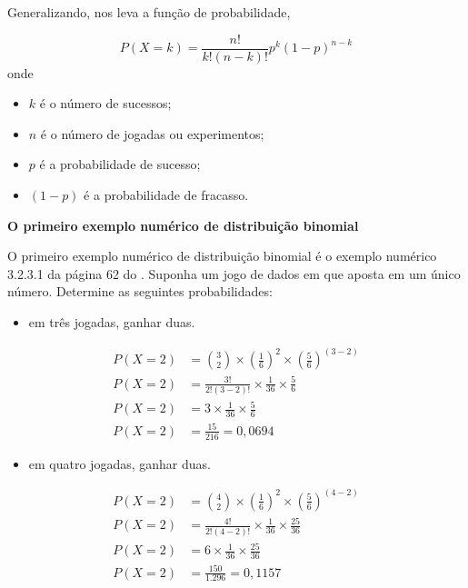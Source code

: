 \documentclass[
]{book}
\providecommand{\tightlist}{%
  \setlength{\itemsep}{0pt}\setlength{\parskip}{0pt}}
\begin{document}
Generalizando, nos leva a função de probabilidade,

\begin{equation*}
  P(X=k) = \frac{n!}{k!(n-k)!} p^k (1-p)^{n-k}
\end{equation*}
onde

\begin{itemize}
\tightlist
\item
  \(k\) é o número de sucessos;
\item
  \(n\) é o número de jogadas ou experimentos;
\item
  \(p\) é a probabilidade de sucesso;
\item
  \((1-p)\) é a probabilidade de fracasso.
\end{itemize}

\textbf{O primeiro exemplo numérico de distribuição binomial}

O primeiro exemplo numérico de distribuição binomial é o exemplo numérico 3.2.3.1 da página 62 do \citet{Sartoris2013}. Suponha um jogo de dados em que aposta em um único número. Determine as seguintes probabilidades:

\begin{itemize}
\tightlist
\item
  em três jogadas, ganhar duas.
\end{itemize}

\begin{align*}
  P(X=2) &= \binom{3}{2} \times \left(\frac{1}{6}\right)^2\times \left(\frac{5}{6}\right)^{(3-2)}\\
  P(X=2) &= \frac{3!}{2!(3-2)!}\times \frac{1}{36} \times \frac{5}{6}\\
  P(X=2) &= 3 \times \frac{1}{36} \times \frac{5}{6}\\
  P(X=2) &= \frac{15}{216} = 0,0694
\end{align*}

\begin{itemize}
\tightlist
\item
  em quatro jogadas, ganhar duas.
\end{itemize}

\begin{align*}
  P(X=2) &= \binom{4}{2} \times \left(\frac{1}{6}\right)^2\times \left(\frac{5}{6}\right)^{(4-2)}\\
  P(X=2) &= \frac{4!}{2!(4-2)!}\times \frac{1}{36} \times \frac{25}{36}\\
  P(X=2) &= 6 \times \frac{1}{36} \times \frac{25}{36}\\
  P(X=2) &= \frac{150}{1.296} = 0,1157
\end{align*}
\end{document}
